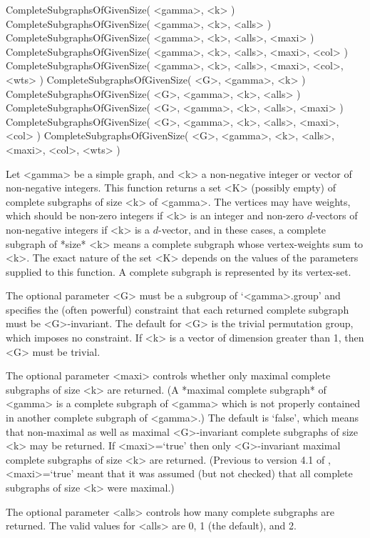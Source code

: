 
\>CompleteSubgraphsOfGivenSize( <gamma>, <k> )
\>CompleteSubgraphsOfGivenSize( <gamma>, <k>, <alls> )
\>CompleteSubgraphsOfGivenSize( <gamma>, <k>, <alls>, <maxi> )
\>CompleteSubgraphsOfGivenSize( <gamma>, <k>, <alls>, <maxi>, <col> )
\>CompleteSubgraphsOfGivenSize( <gamma>, <k>, <alls>, <maxi>, <col>, <wts> ) 
\>CompleteSubgraphsOfGivenSize( <G>, <gamma>, <k> )
\>CompleteSubgraphsOfGivenSize( <G>, <gamma>, <k>, <alls> )
\>CompleteSubgraphsOfGivenSize( <G>, <gamma>, <k>, <alls>, <maxi> )
\>CompleteSubgraphsOfGivenSize( <G>, <gamma>, <k>, <alls>, <maxi>, <col> )
\>CompleteSubgraphsOfGivenSize( <G>, <gamma>, <k>, <alls>, <maxi>, <col>, <wts> ) 

Let <gamma> be a simple graph, and <k> a non-negative integer or vector
of non-negative integers.  This function returns a set <K> (possibly
empty) of complete subgraphs of size <k> of <gamma>.  The vertices may
have weights, which should be non-zero integers if <k> is an integer and
non-zero $d$-vectors of non-negative integers if <k> is a $d$-vector,
and in these cases, a complete subgraph of *size* <k> means a complete
subgraph whose vertex-weights sum to <k>.  The exact nature of the set
<K> depends on the values of the parameters supplied to this function. A
complete subgraph is represented by its vertex-set.

The optional parameter <G> must be a subgroup of `<gamma>.group' and
specifies the (often powerful) constraint that each returned complete
subgraph must be <G>-invariant. The default for <G> is the trivial
permutation group, which imposes no constraint. If <k> is a vector
of dimension greater than 1, then <G> must be trivial.

The optional parameter <maxi> controls whether only maximal complete
subgraphs of size <k> are returned. (A *maximal complete subgraph* of 
<gamma> is a complete subgraph of <gamma> which is not properly contained 
in another complete subgraph of <gamma>.) The default is `false', which 
means that non-maximal as well as maximal <G>-invariant complete subgraphs 
of size <k> may be returned. If <maxi>=`true' then only <G>-invariant maximal
complete subgraphs of size <k> are returned. (Previous to version 4.1
of {\GRAPE}, <maxi>=`true' meant that it was assumed (but not checked)
that all complete subgraphs of size <k> were maximal.)

The optional parameter <alls> controls how many complete subgraphs are
returned. The valid values for <alls> are 0, 1 (the default), and 2.

